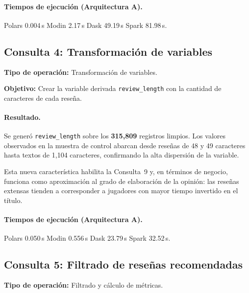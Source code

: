 \paragraph{Tiempos de ejecución (Arquitectura A).}
Polars 0.004\,s \textbar{} Modin 2.17\,s \textbar{} Dask 49.19\,s \textbar{} Spark 81.98\,s.



\subsection{Consulta 4: Transformación de variables}

\textbf{Tipo de operación:} Transformación de variables.

\textbf{Objetivo:} Crear la variable derivada \texttt{review\_length} con la cantidad de caracteres de cada reseña.


\paragraph{Resultado.}
Se generó \texttt{review\_length} sobre los \textbf{315,809} registros limpios. Los valores observados en la muestra de control abarcan desde reseñas de 48 y 49 caracteres hasta textos de 1,104 caracteres, confirmando la alta dispersión de la variable.

Esta nueva característica habilita la Consulta~9 y, en términos de negocio, funciona como aproximación al grado de elaboración de la opinión: las reseñas extensas tienden a corresponder a jugadores con mayor tiempo invertido en el título.

\paragraph{Tiempos de ejecución (Arquitectura A).}
Polars 0.050\,s \textbar{} Modin 0.556\,s \textbar{} Dask 23.79\,s \textbar{} Spark 32.52\,s.



\subsection{Consulta 5: Filtrado de reseñas recomendadas}

\textbf{Tipo de operación:} Filtrado y cálculo de métricas.

